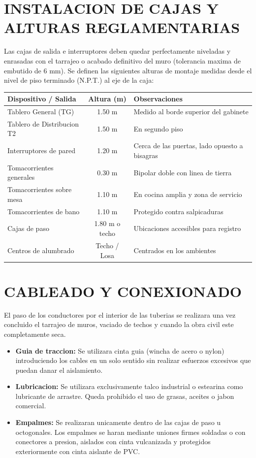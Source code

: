 \section{INSTALACION DE CAJAS Y ALTURAS REGLAMENTARIAS}

Las cajas de salida e interruptores deben quedar perfectamente niveladas y enrasadas con el tarrajeo o acabado definitivo del muro (tolerancia maxima de embutido de \(6\text{ mm}\)). Se definen las siguientes alturas de montaje medidas desde el nivel de piso terminado (N.P.T.) al eje de la caja:

\begin{center}
\begin{tabular}{l c l}
\toprule
\textbf{Dispositivo / Salida} & \textbf{Altura (m)} & \textbf{Observaciones} \\
\midrule
Tablero General (TG) & 1.50 m & Medido al borde superior del gabinete \\
Tablero de Distribucion T2 & 1.50 m & En segundo piso \\
Interruptores de pared & 1.20 m & Cerca de las puertas, lado opuesto a bisagras \\
Tomacorrientes generales & 0.30 m & Bipolar doble con linea de tierra \\
Tomacorrientes sobre mesa & 1.10 m & En cocina amplia y zona de servicio \\
Tomacorrientes de bano & 1.10 m & Protegido contra salpicaduras \\
Cajas de paso & 1.80 m o techo & Ubicaciones accesibles para registro \\
Centros de alumbrado & Techo / Losa & Centrados en los ambientes \\
\bottomrule
\end{tabular}
\end{center}

\section{CABLEADO Y CONEXIONADO}

El paso de los conductores por el interior de las tuberias se realizara una vez concluido el tarrajeo de muros, vaciado de techos y cuando la obra civil este completamente seca.
\begin{itemize}
  \item \textbf{Guia de traccion:} Se utilizara cinta guia (wincha de acero o nylon) introduciendo los cables en un solo sentido sin realizar esfuerzos excesivos que puedan danar el aislamiento.
  \item \textbf{Lubricacion:} Se utilizara exclusivamente talco industrial o estearina como lubricante de arrastre. Queda prohibido el uso de grasas, aceites o jabon comercial.
  \item \textbf{Empalmes:} Se realizaran unicamente dentro de las cajas de paso u octogonales. Los empalmes se haran mediante uniones firmes soldadas o con conectores a presion, aislados con cinta vulcanizada y protegidos exteriormente con cinta aislante de PVC.
\end{itemize}

